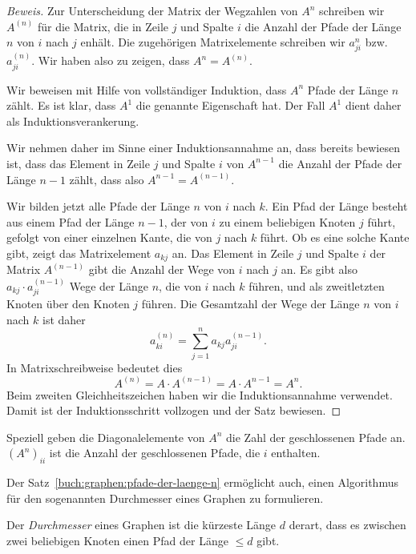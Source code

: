 \begin{proof}[Beweis]
Zur Unterscheidung der Matrix der Wegzahlen von $A^n$ schreiben wir
$A^{(n)}$ für die Matrix, die in Zeile
$j$ und Spalte $i$ die Anzahl der Pfade der Länge $n$ von $i$ nach $j$
enhält.
Die zugehörigen Matrixelemente schreiben wir $a_{ji}^{n}$ bzw.~$a_{ji}^{(n)}$.
Wir haben also zu zeigen, dass $A^n = A^{(n)}$.

Wir beweisen mit Hilfe von vollständiger Induktion,
dass $A^n$ Pfade der Länge $n$ zählt.
Es ist klar, dass $A^1$ die genannte Eigenschaft hat.
Der Fall $A^1$ dient daher als Induktionsverankerung.

Wir nehmen daher im Sinne einer Induktionsannahme an, dass bereits
bewiesen ist, dass das Element in Zeile
$j$ und Spalte $i$ von $A^{n-1}$ die Anzahl der Pfade der Länge $n-1$
zählt, dass also $A^{n-1}=A^{(n-1)}$.

Wir bilden jetzt alle Pfade der Länge $n$ von $i$ nach $k$.
Ein Pfad der Länge besteht aus einem Pfad der Länge $n-1$, der von $i$ zu
einem beliebigen Knoten $j$ führt, gefolgt von einer einzelnen Kante,
die von $j$ nach $k$ führt.
Ob es eine solche Kante gibt, zeigt das Matrixelement $a_{k\!j}$ an.
Das Element in Zeile $j$ und Spalte $i$ der Matrix $A^{(n-1)}$ gibt
die Anzahl der Wege von $i$ nach $j$ an.
Es gibt also $a_{k\!j}\cdot a_{ji}^{(n-1)}$ Wege der Länge $n$, die von $i$
nach $k$ führen, und als zweitletzten Knoten über den Knoten $j$ führen.
Die Gesamtzahl der Wege der Länge $n$ von $i$ nach $k$ ist daher
\[
a_{ki}^{(n)}
=
\sum_{j=1}^n a_{k\!j} a_{ji}^{(n-1)}.
\]
In Matrixschreibweise bedeutet dies
\[
A^{(n)}
=
A\cdot A^{(n-1)}
=
A\cdot A^{n-1}
=
A^n.
\]
Beim zweiten Gleichheitszeichen haben wir die Induktionsannahme
verwendet.
Damit ist der Induktionsschritt vollzogen und der Satz bewiesen.
\end{proof}

Speziell geben die Diagonalelemente von $A^n$ die Zahl der geschlossenen
Pfade an.
$(A^n)_{ii}$ ist die Anzahl der geschlossenen Pfade, die $i$ enthalten.

Der Satz~\ref{buch:graphen:pfade-der-laenge-n} ermöglicht auch, einen 
Algorithmus für den sogenannten Durchmesser eines Graphen zu formulieren.

\begin{definition}
%
%
Der {\em Durchmesser} eines Graphen ist die kürzeste Länge $d$ derart, dass
es zwischen zwei beliebigen Knoten einen Pfad der Länge $\le d$ gibt.
\end{definition}


